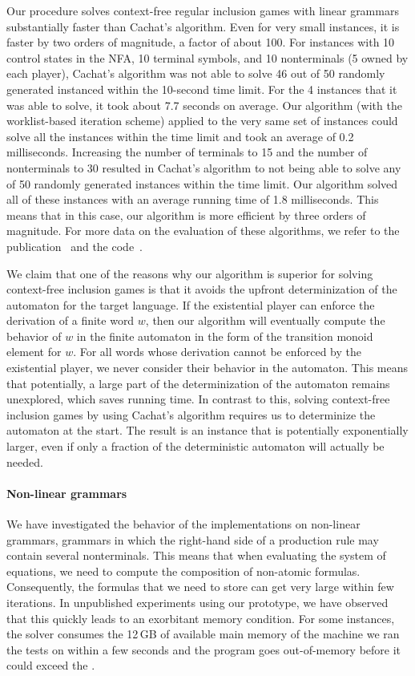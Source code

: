 \documentclass[../../diss.tex]{subfiles}
\begin{document}
Our procedure solves context-free regular inclusion games with linear grammars substantially faster than Cachat's algorithm.
Even for very small instances, it is faster by two orders of magnitude, \ie a factor of about 100.
For instances with 10 control states in the NFA, 10 terminal symbols, and 10 nonterminals (5 owned by each player), Cachat's algorithm was not able to solve 46 out of 50 randomly generated instanced within the 10-second time limit.
For the 4 instances that it was able to solve, it took about 7.7 seconds on average.
Our algorithm (with the worklist-based iteration scheme) applied to the very same set of instances could solve all the instances within the time limit and took an average of 0.2 milliseconds.
Increasing the number of terminals to 15 and the number of nonterminals to 30 resulted in Cachat's algorithm to not being able to solve any of 50 randomly generated instances within the time limit.
Our algorithm solved all of these instances with an average running time of 1.8 milliseconds.
This means that in this case, our algorithm is more efficient by three orders of magnitude.
For more data on the evaluation of these algorithms, we refer to the publication~\cite{HolikMM16} and the code~\cite{Muskalla16}.

We claim that one of the reasons why our algorithm is superior for solving context-free inclusion games is that it avoids the upfront determinization of the automaton for the target language.
If the existential player can enforce the derivation of a finite word $w$, then our algorithm will eventually compute the behavior of $w$ in the finite automaton in the form of the transition monoid element for $w$.
For all words whose derivation cannot be enforced by the existential player, we never consider their behavior in the automaton.
This means that potentially, a large part of the determinization of the automaton remains unexplored, which saves running time.
In contrast to this, solving context-free inclusion games by using Cachat's algorithm requires us to determinize the automaton at the start.
The result is an instance that is potentially exponentially larger, even if only a fraction of the deterministic automaton will actually be needed.

\paragraph{Non-linear grammars}

We have investigated the behavior of the implementations on non-linear grammars, \ie grammars in which the right-hand side of a production rule may contain several nonterminals.
This means that when evaluating the system of equations, we need to compute the composition of non-atomic formulas.
Consequently, the formulas that we need to store can get very large within few iterations.
In unpublished experiments using our prototype, we have observed that this quickly leads to an exorbitant memory condition.
For some instances, the solver consumes the 12\,GB of available main memory of the machine we ran the tests on within a few seconds and the program goes out-of-memory before it could exceed the .
\end{document}
